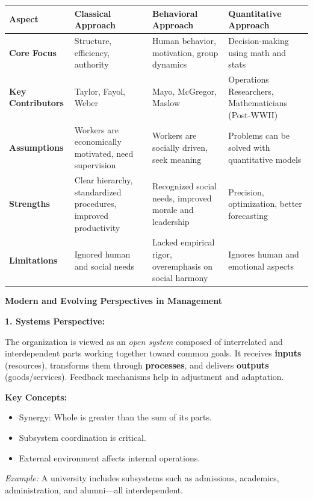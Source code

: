 \documentclass[10pt,a4paper]{book}
\begin{document}
\begin{tabular}{|p{4cm}|p{4cm}|p{4cm}|p{4cm}|}
\hline
\textbf{Aspect} & \textbf{Classical Approach} & \textbf{Behavioral Approach} & \textbf{Quantitative Approach} \\
\hline
\textbf{Core Focus} & Structure, efficiency, authority & Human behavior, motivation, group dynamics & Decision-making using math and stats \\
\hline
\textbf{Key Contributors} & Taylor, Fayol, Weber & Mayo, McGregor, Maslow & Operations Researchers, Mathematicians (Post-WWII) \\
\hline
\textbf{Assumptions} & Workers are economically motivated, need supervision & Workers are socially driven, seek meaning & Problems can be solved with quantitative models \\
\hline
\textbf{Strengths} & Clear hierarchy, standardized procedures, improved productivity & Recognized social needs, improved morale and leadership & Precision, optimization, better forecasting \\
\hline
\textbf{Limitations} & Ignored human and social needs & Lacked empirical rigor, overemphasis on social harmony & Ignores human and emotional aspects \\
\hline
\end{tabular}

\vspace{0.8cm}

\textbf{Modern and Evolving Perspectives in Management}

\textbf{1. Systems Perspective:}

The organization is viewed as an \textit{open system} composed of interrelated and interdependent parts working together toward common goals. It receives \textbf{inputs} (resources), transforms them through \textbf{processes}, and delivers \textbf{outputs} (goods/services). Feedback mechanisms help in adjustment and adaptation.

\textbf{Key Concepts:}
\begin{itemize}
    \item Synergy: Whole is greater than the sum of its parts.
    \item Subsystem coordination is critical.
    \item External environment affects internal operations.
\end{itemize}

\textit{Example:} A university includes subsystems such as admissions, academics, administration, and alumni—all interdependent.
\end{document}
